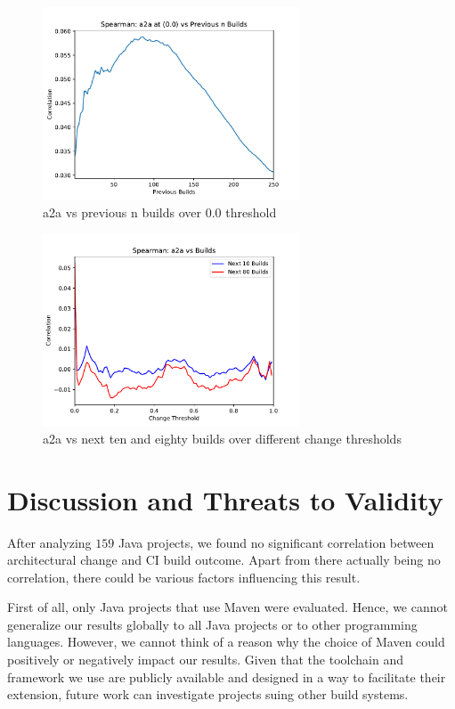 \documentclass[sigplan, anonymous, review]{acmart}
\begin{document}
\begin{figure}[!t]
	\centering
	\includegraphics[width=3in]{assets/PrevN}
	\caption{a2a vs previous n builds over 0.0 threshold }
	\label{a2aPrevN}
\end{figure}

\begin{figure}[!t]
	\centering
	\includegraphics[width=3in]{assets/a2aCorr}
	\caption{a2a vs next ten and eighty builds over different change thresholds }
	\label{a2aPlot}
\end{figure}


\section{Discussion and Threats to Validity}

After analyzing $159$ Java projects, we found no significant correlation between architectural change and CI build outcome. Apart from there actually being no correlation, there could be various factors influencing this result. 

First of all, only Java projects that use Maven were evaluated. Hence, we cannot generalize our results globally to all Java projects or to other programming languages. However, we cannot think of a reason why the choice of Maven could positively or negatively impact our results. Given that the toolchain and framework we use are publicly available and designed in a way to facilitate their extension, future work can investigate projects suing other build systems.
\end{document}
